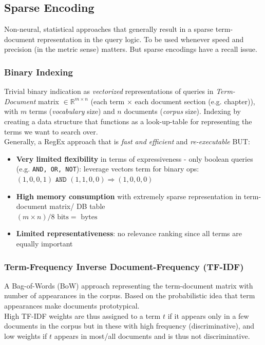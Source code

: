 \documentclass{article}
\begin{document}
\subsection{Sparse Encoding}
Non-neural, statistical approaches that generally result in a sparse term-document representation in the query logic. To be used whenever speed and precision (in the metric sense) matters. But sparse encodings have a recall issue.
\subsubsection{Binary Indexing}
Trivial binary indication as \textit{vectorized} representations of queries in \textit{Term-Document} matrix $\in \mathbb{R}^{m\times n}$ (each term $\times$ each document section (e.g. chapter)), with $m$ terms (\textit{vocabulary} size) and $n$ documents (\textit{corpus} size). Indexing by creating a data structure that functions as a look-up-table for representing the terms we want to search over. \\
Generally, a RegEx approach that is \textit{fast and efficient} and \textit{re-executable} BUT:

\begin{itemize}
    \item \textbf{Very limited flexibility} in terms of expressiveness - only boolean queries (e.g. \texttt{AND, OR, NOT}): leverage vectors term for binary ops: $(1,0,0,1) \texttt{ AND }(1,1,0,0) \Rightarrow (1,0,0,0)$
    \item \textbf{High memory consumption} with extremely sparse representation in term-document matrix/ DB table \\ $(m \times n) / 8 \text{ bits} = \text{ bytes}$
    \item \textbf{Limited representativeness}: no relevance ranking since all terms are equally important
\end{itemize}

\subsubsection{Term-Frequency Inverse Document-Frequency (TF-IDF)}
A Bag-of-Words (BoW) approach representing the term-document matrix with number of appearances in the corpus. Based on the probabilistic idea that term appearances make documents prototypical. \\

High TF-IDF weights are thus assigned to a term $t$ if it appears only in a few documents in the corpus but in these with high frequency (discriminative), and low weights if $t$ appears in most/all documents and is thus not discriminative.\\
\end{document}
